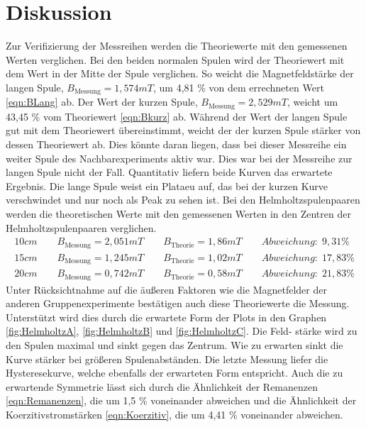 \documentclass[titlepage = firstcover]{scrartcl}
\begin{document}
\section{Diskussion}
        Zur Verifizierung der Messreihen werden die Theoriewerte mit den gemessenen Werten verglichen. Bei den beiden normalen Spulen wird der Theoriewert mit
        dem Wert in der Mitte der Spule verglichen. So weicht die Magnetfeldstärke der langen Spule, $B_{\text{Messung}} = 1,574 mT$,  um 4,81 \% von dem errechneten Wert 
        \ref{eqn:BLang} ab. Der Wert der kurzen Spule, $B_{\text{Messung}} = 2,529 mT$, weicht um 43,45 \% vom Theoriewert \ref{eqn:Bkurz} ab. Während der Wert
        der langen Spule gut mit dem Theoriewert übereinstimmt, weicht der der kurzen Spule stärker von dessen Theoriewert ab. Dies könnte daran liegen, dass bei
        dieser Messreihe ein weiter Spule des Nachbarexperiments aktiv war. Dies war bei der Messreihe zur langen Spule nicht der Fall. Quantitativ liefern 
        beide Kurven das erwartete Ergebnis. Die lange Spule weist ein Plataeu auf, das bei der kurzen Kurve verschwindet und nur noch als Peak zu sehen ist.
        Bei den Helmholtzspulenpaaren werden die theoretischen Werte mit den gemessenen Werten in den Zentren der Helmholtzspulenpaaren verglichen.
        \begin{align*}
            10cm \qquad B_{\text{Messung}} = 2,051 mT \qquad B_{\text{Theorie}} = 1,86 mT \qquad Abweichung: \; 9,31 \% \\
            15cm \qquad B_{\text{Messung}} = 1,245 mT \qquad B_{\text{Theorie}} = 1,02 mT \qquad Abweichung: \; 17,83 \% \\
            20cm \qquad B_{\text{Messung}} = 0,742 mT \qquad B_{\text{Theorie}} = 0,58 mT \qquad Abweichung: \; 21,83 \% 
        \end{align*}
        Unter Rücksichtnahme auf die äußeren Faktoren wie die Magnetfelder der anderen Gruppenexperimente bestätigen auch diese Theoriewerte die Messung.
        Unterstützt wird dies durch die erwartete Form der Plots in den Graphen \ref{fig:HelmholtzA}, \ref{fig:HelmholtzB} und \ref{fig:HelmholtzC}. Die Feld-
        stärke wird zu den Spulen maximal und sinkt gegen das Zentrum. Wie zu erwarten sinkt die Kurve stärker bei größeren Spulenabständen.
        Die letzte Messung liefer die Hysteresekurve, welche ebenfalls der erwarteten Form entspricht. Auch die zu erwartende Symmetrie lässt sich durch die 
        Ähnlichkeit der Remanenzen \ref{eqn:Remanenzen}, die um 1,5 \% voneinander abweichen und die Ähnlichkeit der Koerzitivstromstärken \ref{eqn:Koerzitiv},
        die um 4,41 \% voneinander abweichen. 
\end{document}
